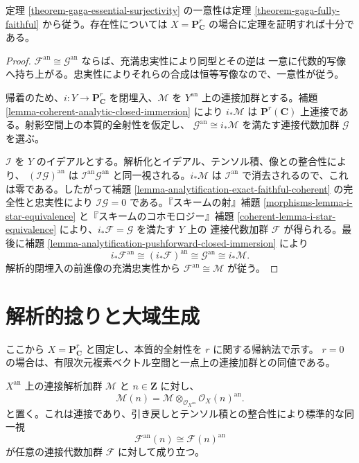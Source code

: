 \begin{lemma}
\label{lemma-gaga-essential-surjectivity-projective-reduction}
定理 \ref{theorem-gaga-essential-surjectivity} の一意性は定理
\ref{theorem-gaga-fully-faithful} から従う。存在性については
$X=\mathbf P^r_{\mathbf C}$ の場合に定理を証明すれば十分である。
\end{lemma}

\begin{proof}
$\mathcal F^{\mathrm{an}}\cong\mathcal G^{\mathrm{an}}$ ならば、充満忠実性により同型とその逆は
一意に代数的写像へ持ち上がる。忠実性によりそれらの合成は恒等写像なので、一意性が従う。

帰着のため、$i:Y\to\mathbf P^r_{\mathbf C}$ を閉埋入、$\mathcal M$ を
$Y^{\mathrm{an}}$ 上の連接加群とする。補題
\ref{lemma-coherent-analytic-closed-immersion} により $i_*\mathcal M$ は
$\mathbf P^r(\mathbf C)$ 上連接である。射影空間上の本質的全射性を仮定し、
$\mathcal G^{\mathrm{an}}\cong i_*\mathcal M$ を満たす連接代数加群 $\mathcal G$ を選ぶ。

$\mathcal I$ を $Y$ のイデアルとする。解析化とイデアル、テンソル積、像との整合性により、
$(\mathcal I\mathcal G)^{\mathrm{an}}$ は
$\mathcal I^{\mathrm{an}}\mathcal G^{\mathrm{an}}$ と同一視される。$i_*\mathcal M$ は
$\mathcal I^{\mathrm{an}}$ で消去されるので、これは零である。したがって補題
\ref{lemma-analytification-exact-faithful-coherent} の完全性と忠実性により
$\mathcal I\mathcal G=0$ である。『スキームの射』補題
\ref{morphisms-lemma-i-star-equivalence} と『スキームのコホモロジー』補題
\ref{coherent-lemma-i-star-equivalence} により、$i_*\mathcal F=\mathcal G$ を満たす $Y$ 上の
連接代数加群 $\mathcal F$ が得られる。最後に補題
\ref{lemma-analytification-pushforward-closed-immersion} により
$$
i_*\mathcal F^{\mathrm{an}}
\cong(i_*\mathcal F)^{\mathrm{an}}
\cong\mathcal G^{\mathrm{an}}
\cong i_*\mathcal M.
$$
解析的閉埋入の前進像の充満忠実性から
$\mathcal F^{\mathrm{an}}\cong\mathcal M$ が従う。
\end{proof}

\section{解析的捻りと大域生成}
\label{section-gaga-analytic-twists}

ここから $X=\mathbf P^r_{\mathbf C}$ と固定し、本質的全射性を $r$ に関する帰納法で示す。
$r=0$ の場合は、有限次元複素ベクトル空間と一点上の連接加群との同値である。

\begin{definition}
\label{definition-coherent-analytic-twist}
$X^{\mathrm{an}}$ 上の連接解析加群 $\mathcal M$ と $n\in\mathbf Z$ に対し、
$$
\mathcal M(n)=
\mathcal M\otimes_{\mathcal O_{X^{\mathrm{an}}}}
\mathcal O_X(n)^{\mathrm{an}}.
$$
と置く。これは連接であり、引き戻しとテンソル積との整合性により標準的な同一視
$$
\mathcal F^{\mathrm{an}}(n)\cong\mathcal F(n)^{\mathrm{an}}
$$
が任意の連接代数加群 $\mathcal F$ に対して成り立つ。
\end{definition}

